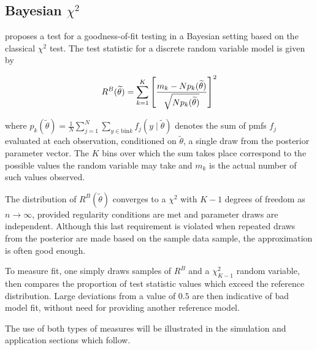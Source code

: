 \subsection{Bayesian $\chi^2$}

\cite{johnson2004bayesian} proposes a test for a goodness-of-fit testing in a Bayesian setting based on the classical $\chi^2$ test. The test statistic for a discrete random variable model is given by

\begin{equation}
R^B(\widetilde{\theta}) = \sum_{k=1}^K \left[{m_k - Np_k(\widetilde{\theta}) \over \sqrt{Np_k(\widetilde{\theta})}}\right]^2
\end{equation}

where $p_k(\widetilde{\theta}) = \frac{1}{N} \sum_{j=1}^N\sum_{y\in \text{bin}k}f_j(y \mid \widetilde{\theta})$ denotes the sum of pmfs $f_j$ evaluated at each observation, conditioned on $\widetilde{\theta}$, a single draw from the posterior parameter vector. The $K$ bins over which the sum takes place correspond to the possible values the random variable may take and $m_k$ is the actual number of such values observed.

The distribution of $R^B(\widetilde{\theta})$ converges to a $\chi^2$ with $K-1$ degrees of freedom as $n \rightarrow \infty$, provided regularity conditions are met and parameter draws are independent. Although this last requirement is violated when repeated draws from the posterior are made based on the sample data sample, the approximation is often good enough. 

To measure fit, one simply draws samples of $R^B$ and a  $\chi^2_{K-1}$ random variable, then compares the proportion of test statistic values which exceed the reference distribution. Large deviations from a value of $0.5$ are then indicative of bad model fit, without need for providing another reference model.

The use of both types of measures will be illustrated in the simulation and application sections which follow.